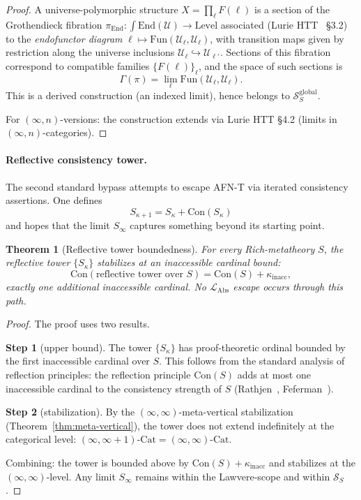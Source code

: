 \documentclass[11pt]{article}
\theoremstyle{plain}
\newtheorem{theorem}{Theorem}[section]
\theoremstyle{definition}
\newcommand{\cS}{\mathcal{S}}
\newcommand{\LAbs}{\mathcal{L}_{\mathrm{Abs}}}
\newcommand{\Fun}{\mathrm{Fun}}
\newcommand{\Cat}{\mathrm{Cat}}
\newcommand{\Con}{\mathrm{Con}}
\newcommand{\cU}{\mathcal{U}}
\begin{document}
\begin{proof}
A universe-polymorphic structure $X = \prod_\ell F(\ell)$ is a section of the Grothendieck fibration $\pi_{\mathrm{End}} : \int \mathrm{End}(\cU) \to \mathrm{Level}$ associated (Lurie HTT~\cite{LurieHTT} \S 3.2) to the \emph{endofunctor diagram} $\ell \mapsto \Fun(\cU_\ell, \cU_\ell)$, with transition maps given by restriction along the universe inclusions $\cU_\ell \hookrightarrow \cU_{\ell'}$. Sections of this fibration correspond to compatible families $\{F(\ell)\}_\ell$, and the space of such sections is
\[ \Gamma(\pi) = \lim_\ell \Fun(\cU_\ell, \cU_\ell). \]
This is a derived construction (an indexed limit), hence belongs to $\cS_S^{\mathrm{global}}$.

For $(\infty, n)$-versions: the construction extends via Lurie HTT \S 4.2 (limits in $(\infty, n)$-categories).
\end{proof}

\paragraph{Reflective consistency tower.} The second standard bypass attempts to escape AFN-T via iterated consistency assertions. One defines
\[ S_{\kappa+1} = S_\kappa + \Con(S_\kappa) \]
and hopes that the limit $S_\infty$ captures something beyond its starting point.

\begin{theorem}[Reflective tower boundedness]\label{thm:reflective}
For every Rich-metatheory $S$, the reflective tower $\{S_\kappa\}$ stabilizes at an inaccessible cardinal bound:
\[ \Con(\text{reflective tower over }S) = \Con(S) + \kappa_{\mathrm{inacc}}, \]
exactly one additional inaccessible cardinal. No $\LAbs$ escape occurs through this path.
\end{theorem}

\begin{proof}
The proof uses two results.

\textbf{Step 1} (upper bound). The tower $\{S_\kappa\}$ has proof-theoretic ordinal bounded by the first inaccessible cardinal over $S$. This follows from the standard analysis of reflection principles: the reflection principle $\Con(S)$ adds at most one inaccessible cardinal to the consistency strength of $S$ (Rathjen~\cite{Rathjen1999}, Feferman~\cite{Feferman1964}).

\textbf{Step 2} (stabilization). By the $(\infty, \infty)$-meta-vertical stabilization (Theorem~\ref{thm:meta-vertical}), the tower does not extend indefinitely at the categorical level: $(\infty, \infty + 1)\text{-}\Cat = (\infty, \infty)\text{-}\Cat$.

Combining: the tower is bounded above by $\Con(S) + \kappa_{\mathrm{inacc}}$ and stabilizes at the $(\infty, \infty)$-level. Any limit $S_\infty$ remains within the Lawvere-scope and within $\cS_S$.
\end{proof}
\end{document}
